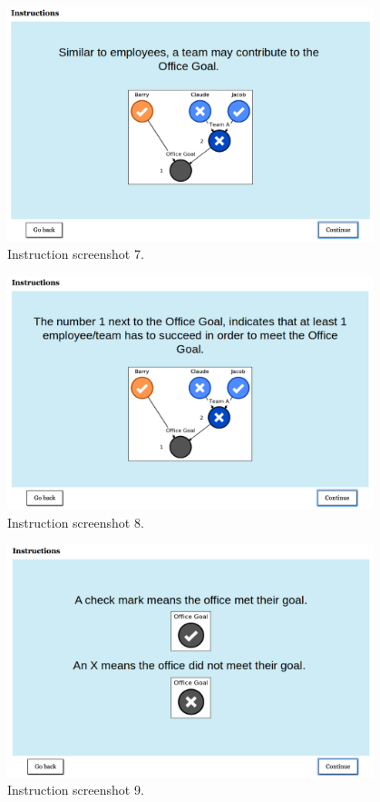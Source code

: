 \documentclass[11pt]{article}
\begin{document}
\begin{figure}[H]
	\centering
	\includegraphics[width=0.95\textwidth]{screenshot_7}
	\caption{Instruction screenshot 7.}
	\label{fig:screenshot_7}
\end{figure}
\begin{figure}[H]
	\centering
	\includegraphics[width=0.95\textwidth]{screenshot_8}
	\caption{Instruction screenshot 8.}
	\label{fig:screenshot_8}
\end{figure}
\begin{figure}[H]
	\centering
	\includegraphics[width=0.95\textwidth]{screenshot_9}
	\caption{Instruction screenshot 9.}
	\label{fig:screenshot_9}
\end{figure}
\end{document}
